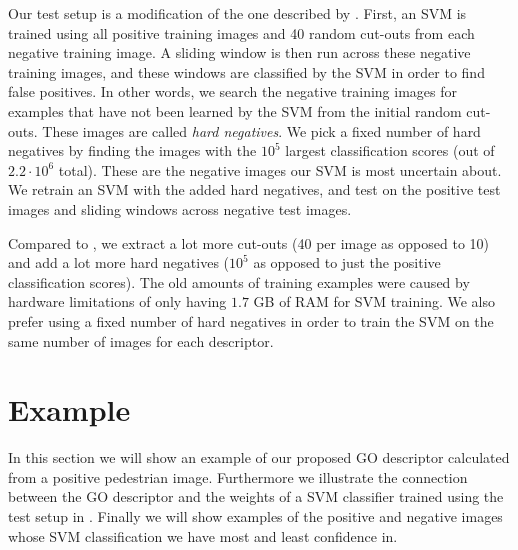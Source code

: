 \documentclass[thesis.tex]{subfiles}
\begin{document}
Our test setup is a modification of the one described by \citet{dalal2005histograms}. First, an SVM is trained using all positive training images and 40 random cut-outs from each negative training image. A sliding window is then run across these negative training images, and these windows are classified by the SVM in order to find false positives. In other words, we search the negative training images for examples that have not been learned by the SVM from the initial random cut-outs. These images are called \emph{hard negatives}. We pick a fixed number of hard negatives by finding the images with the $10^5$ largest classification scores (out of $2.2 \cdot 10^6$ total). These are the negative images our SVM is most uncertain about. We retrain an SVM with the added hard negatives, and test on the positive test images and sliding windows across negative test images.

Compared to \citet{dalal2005histograms}, we extract a lot more cut-outs (40 per image as opposed to 10) and add a lot more hard negatives ($10^5$ as opposed to just the positive classification scores). The old amounts of training examples were caused by hardware limitations of only having $1.7$ GB of RAM for SVM training. We also prefer using a fixed number of hard negatives in order to train the SVM on the same number of images for each descriptor.

\section{Example}
%
In this section we will show an example of our proposed GO descriptor calculated from a positive pedestrian image. Furthermore we illustrate the connection between the GO descriptor and the weights of a SVM classifier trained using the test setup in .
Finally we will show examples of the positive and negative images whose SVM classification we have most and least confidence in.
\end{document}
